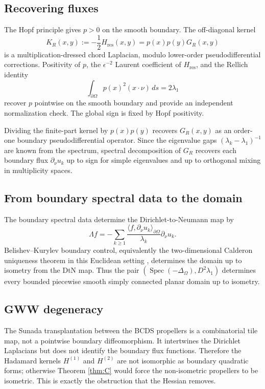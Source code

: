 \documentclass[11pt,reqno]{amsart}
\theoremstyle{plain}
\theoremstyle{definition}
\theoremstyle{remark}
\DeclareMathOperator{\Spec}{Spec}
\newcommand{\Lambdaop}{\Lambda}
\begin{document}
\subsection{Recovering fluxes}\label{app:ss-flux-recovery}

The Hopf principle gives $p>0$ on the smooth boundary. The off-diagonal kernel
\[
K_R(x,y):=-\frac12H_{\mathrm{res}}(x,y)=p(x)p(y)G_R(x,y)
\]
is a multiplication-dressed chord Laplacian, modulo lower-order pseudodifferential corrections. Positivity of $p$, the $\epsilon^{-2}$ Laurent coefficient of $H_{\mathrm{res}}$, and the Rellich identity
\[
\int_{\partial\Omega}p(x)^2(x\cdot\nu)\,ds=2\lambda_1
\]
recover $p$ pointwise on the smooth boundary and provide an independent normalization check. The global sign is fixed by Hopf positivity.

Dividing the finite-part kernel by $p(x)p(y)$ recovers $G_R(x,y)$ as an order-one boundary pseudodifferential operator. Since the eigenvalue gaps $(\lambda_k-\lambda_1)^{-1}$ are known from the spectrum, spectral decomposition of $G_R$ recovers each boundary flux $\partial_\nu u_k$ up to sign for simple eigenvalues and up to orthogonal mixing in multiplicity spaces.

\subsection{From boundary spectral data to the domain}\label{app:ss-bc}

The boundary spectral data determine the Dirichlet-to-Neumann map by
\[
\Lambdaop f
=-\sum_{k\geq1}
\frac{\langle f,\partial_\nu u_k\rangle_{\partial\Omega}}{\lambda_k}
\partial_\nu u_k.
\]
Belishev--Kurylev boundary control, equivalently the two-dimensional Calderon uniqueness theorem in this Euclidean setting \cite{Belishev, LassasUhlmann, SylvesterUhlmann}, determines the domain up to isometry from the DtN map. Thus the pair $(\Spec(-\Delta_\Omega),D^2\lambda_1)$ determines every bounded piecewise smooth simply connected planar domain up to isometry.

\subsection{GWW degeneracy}\label{app:ss-had-gww}

The Sunada transplantation between the BCDS propellers is a combinatorial tile map, not a pointwise boundary diffeomorphism. It intertwines the Dirichlet Laplacians but does not identify the boundary flux functions. Therefore the Hadamard kernels $H^{(1)}$ and $H^{(2)}$ are not isomorphic as boundary quadratic forms; otherwise Theorem \ref{thm:C} would force the non-isometric propellers to be isometric. This is exactly the obstruction that the Hessian removes.
\end{document}
